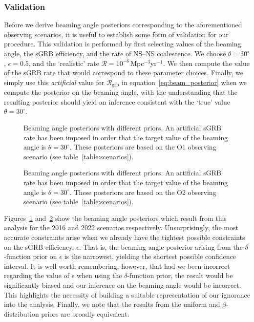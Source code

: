 \documentclass[twocolumn,nofootinbib]{revtex4-1}
\newcommand{\grbrate}{{{\mathcal R}_{\mathrm{grb}}}}
\newcommand{\cbcrate}{{{\mathcal R}}}
\newcommand{\BNS}{\ac{NS}--\ac{NS}\xspace}
\begin{document}
\subsubsection{Validation}
Before we derive beaming angle posteriors corresponding to the aforementioned observing scenarios, it is useful to establish some form of validation for our procedure.
This validation is performed by first selecting values of the beaming angle, the \ac{sGRB} efficiency, and the rate of \BNS coalescence.
We choose $\theta=30^{\circ}$, $\epsilon=0.5$, and the `realistic' rate $\cbcrate = 10^{-6}$\,Mpc$^{-3}$yr$^{-1}$.
We then compute the value of the \ac{sGRB} rate that would correspond to these parameter choices.
Finally, we simply use this \emph{artificial} value for $\grbrate$ in equation~\ref{eq:beam_posterior} when we compute the posterior on the beaming angle, with the understanding that the resulting posterior should yield an inference consistent with the `true' value $\theta=30^{\circ}$.
%
\begin{figure}%
\centering
\caption{Beaming angle posteriors with different priors.
    An artificial \ac{sGRB} rate has been imposed in order that the target value of the beaming angle is $\theta = 30^{\circ}$.
    These posteriors are based on the O1 observing scenario (see table~\ref{table:scenarios}).
    \label{fig:injjetposterio2016}}
\end{figure}
%
\begin{figure}%
\centering
\caption{Beaming angle posteriors with different priors.
    An artificial \ac{sGRB} rate has been imposed in order that the target value of the beaming angle is $\theta = 30^{\circ}$.
    These posteriors are based on the O2 observing scenario (see table~\ref{table:scenarios}).
    \label{fig:injjetposterio2022}}
\end{figure}
%
Figures~\ref{fig:injjetposterio2016} and~\ref{fig:injjetposterio2022} show the beaming angle posteriors which result from this analysis for the 2016 and 2022 scenarios respectively.
Unsurprisingly, the most accurate constraints arise when we already have the tightest possible constraints on the \ac{sGRB} efficiency, $\epsilon$.
That is, the beaming angle posterior arising from the $\delta$-function prior on $\epsilon$ is the narrowest, yielding the shortest possible confidence interval.
It is well worth remembering, however, that had we been incorrect regarding the value of $\epsilon$ when using the $\delta$-function prior, the result would be significantly biased and our inference on the beaming angle would be incorrect.
This highlights the necessity of building a suitable representation of our ignorance into the analysis.
Finally, we note that the results from the uniform and $\beta$-distribution priors are broadly equivalent.
\end{document}
